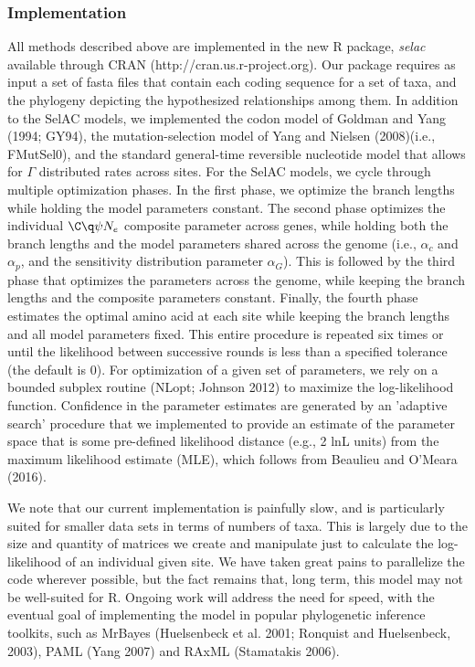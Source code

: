 \documentclass{article}
\newcommand{\Ne}{\ensuremath{{N_e}}\xspace} %
\newcommand{\alphac}{\ensuremath{\alpha_c}\xspace}
\newcommand{\alphag}{\ensuremath{\alpha_G}\xspace}
\newcommand{\alphap}{\ensuremath{\alpha_p}\xspace}
\begin{document}
\subsubsection*{Implementation}
All methods described above are implemented in the new R package, \textit{selac} available through CRAN (http://cran.us.r-project.org). 
Our package requires as input a set of fasta files that contain each coding sequence for a set of taxa, and the phylogeny depicting the hypothesized relationships among them. 
In addition to the SelAC models, we implemented the codon model of Goldman and Yang (1994; GY94), the mutation-selection model of Yang and Nielsen (2008)(i.e., FMutSel0), and the standard general-time reversible nucleotide model that allows for $\Gamma$ distributed rates across sites. 
For the SelAC models, we cycle through multiple optimization phases. 
In the first phase, we optimize the branch lengths while holding the model parameters constant. 
The second phase optimizes the individual $\C\q\psi\Ne$ composite parameter across genes, while holding both the branch lengths and the model parameters shared across the genome (i.e., $\alphac$ and $\alphap$, and the sensitivity distribution parameter \alphag). 
This is followed by the third phase that optimizes the parameters across the genome, while keeping the branch lengths and the composite parameters constant. 
Finally, the fourth phase estimates the optimal amino acid at each site while keeping the branch lengths and all model parameters fixed. 
This entire procedure is repeated six times or until the likelihood between successive rounds is less than a specified tolerance (the default is 0). 
For optimization of a given set of parameters, we rely on a bounded subplex routine (NLopt; Johnson 2012) to maximize the log-likelihood function. 
Confidence in the parameter estimates are generated by an 'adaptive search' procedure that we implemented to provide an estimate of the parameter space that is some pre-defined likelihood distance (e.g., 2 lnL units) from the maximum likelihood estimate (MLE), which follows from Beaulieu and O'Meara (2016). 

We note that our current implementation is painfully slow, and is particularly suited for smaller data sets in terms of numbers of taxa. 
This is largely due to the size and quantity of matrices we create and manipulate just to calculate the log-likelihood of an individual given site.
We have taken great pains to parallelize the code wherever possible, but the fact remains that, long term, this model may not be well-suited for R.
Ongoing work will address the need for speed, with the eventual goal of implementing the model in popular phylogenetic inference toolkits, such as MrBayes (Huelsenbeck et al. 2001; Ronquist and Huelsenbeck, 2003), PAML (Yang 2007) and RAxML (Stamatakis 2006).
\end{document}
